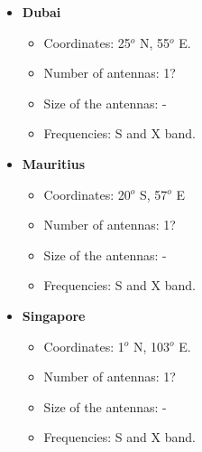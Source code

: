 \begin{itemize}
\begin{itemize}
\end{itemize}
\item \textbf{Dubai}
\begin{itemize}
\item Coordinates: 25$^{o}$ N, 55$^{o}$ E.
\item Number of antennas: 1?
\item Size of the antennas: -
\item Frequencies: S and X band.
\end{itemize}
\item \textbf{Mauritius}
\begin{itemize}
\item Coordinates: 20$^{o}$ S, 57$^{o}$ E
\item Number of antennas: 1?
\item Size of the antennas: -
\item Frequencies: S and X band.
\end{itemize}
\item \textbf{Singapore}
\begin{itemize}
\item Coordinates: 1$^{o}$ N, 103$^{o}$ E.
\item Number of antennas: 1?
\item Size of the antennas: -
\item Frequencies: S and X band.
\end{itemize}
\end{itemize}

